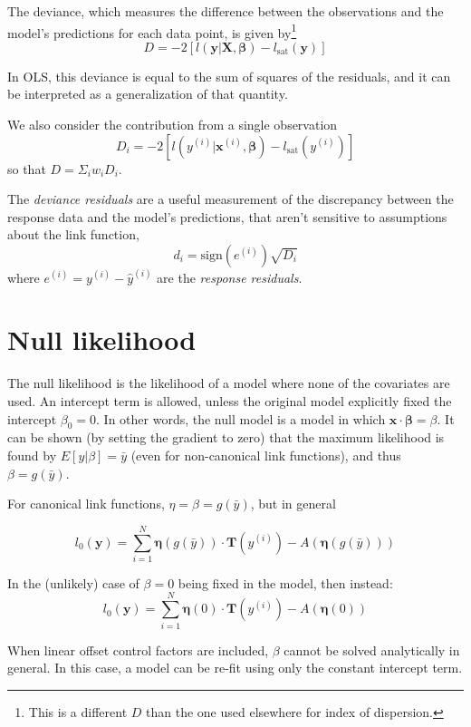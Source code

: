 \documentclass{article}
\newcommand{\bbeta}{\boldsymbol{\beta}}
\begin{document}
The deviance, which measures the difference between the observations and the
model's predictions for each data point, is given by\footnote{
    This is a different \(D\) than the one used elsewhere for index of dispersion.
}
\[D = -2\left[ l(\mathbf{y}|\mathbf{X}, \bbeta) - l_{\textrm{sat}}(\mathbf{y}) \right]\]

In OLS, this deviance is equal to the sum of squares of the residuals, and it
can be interpreted as a generalization of that quantity.

We also consider the contribution from a single observation
\[D_i = -2\left[ l(y^{(i)}|\mathbf{x}^{(i)}, \bbeta) - l_{\textrm{sat}}(y^{(i)}) \right]\]
so that \(D = \Sigma_i w_i D_i\).

The \emph{deviance residuals} are a useful measurement of the discrepancy
between the response data and the model's predictions, that aren't sensitive to
assumptions about the link function,
\[ d_i = \mathrm{sign}(e^{(i)}) \sqrt{D_i} \]
where \(e^{(i)} = y^{(i)} - \hat{y}^{(i)}\) are the \emph{response residuals}.

\section{Null likelihood}

The null likelihood is the likelihood of a model where none of the covariates
are used. An intercept term is allowed, unless the original model explicitly
fixed the intercept \(\beta_0 = 0\). In other words, the null model is a
model in which \(\mathbf{x}\cdot\bbeta = \beta\). It can be shown
(by setting the gradient to zero) that the maximum likelihood is found by
\(E[y|\beta] = \bar{y}\) (even for non-canonical link functions), and thus
\(\beta = g(\bar{y})\).

For canonical link functions, \(\eta = \beta = g(\bar{y})\), but in general

\[l_{0}(\mathbf{y}) = \sum_{i=1}^N \boldsymbol{\eta}(g(\bar{y})) \cdot
\mathbf{T}(y^{(i)}) - A\left(\boldsymbol{\eta}(g(\bar{y})) \right)\]

In the (unlikely) case of \(\beta = 0\) being fixed in the model, then instead:
\[l_{0}(\mathbf{y}) = \sum_{i=1}^N \boldsymbol{\eta}(0) \cdot
\mathbf{T}(y^{(i)}) - A\left(\boldsymbol{\eta}(0) \right)\]

When linear offset control factors are included, \(\beta\) cannot be solved
analytically in general. In this case, a model can be re-fit using only the
constant intercept term.
\end{document}
